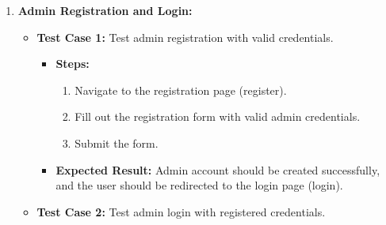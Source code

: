 \begin{enumerate}
    \item \textbf{Admin Registration and Login:}
    \begin{itemize}
        \item \textbf{Test Case 1:} Test admin registration with valid credentials.
        \begin{itemize}
            \item \textbf{Steps:}
            \begin{enumerate}
                \item Navigate to the registration page (register).
                \item Fill out the registration form with valid admin credentials.
                \item Submit the form.
            \end{enumerate}
            \item \textbf{Expected Result:} Admin account should be created successfully, and the user should be redirected to the login page (login).
        \end{itemize}
        \item \textbf{Test Case 2:} Test admin login with registered credentials.


\end{itemize}
\end{enumerate}
